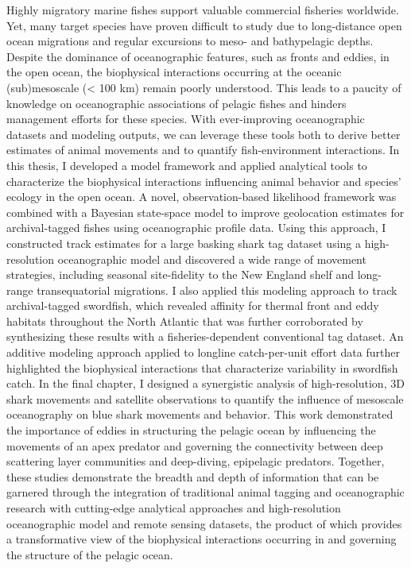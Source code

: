 Highly migratory marine fishes support valuable commercial fisheries worldwide. Yet, many target species have proven difficult to study due to long-distance open ocean migrations and regular excursions to meso- and bathypelagic depths. Despite the dominance of oceanographic features, such as fronts and eddies, in the open ocean, the biophysical interactions occurring at the oceanic (sub)mesoscale (< 100 km) remain poorly understood. This leads to a paucity of knowledge on oceanographic associations of pelagic fishes and hinders management efforts for these species. With ever-improving oceanographic datasets and modeling outputs, we can leverage these tools both to derive better estimates of animal movements and to quantify fish-environment interactions. In this thesis, I developed a model framework and applied analytical tools to characterize the biophysical interactions influencing animal behavior and species' ecology in the open ocean. A novel, observation-based likelihood framework was combined with a Bayesian state-space model to improve geolocation estimates for archival-tagged fishes using oceanographic profile data. Using this approach, I constructed track estimates for a large basking shark tag dataset using a high-resolution oceanographic model and discovered a wide range of movement strategies, including seasonal site-fidelity to the New England shelf and long-range transequatorial migrations. I also applied this modeling approach to track archival-tagged swordfish, which revealed affinity for thermal front and eddy habitats throughout the North Atlantic that was further corroborated by synthesizing these results with a fisheries-dependent conventional tag dataset. An additive modeling approach applied to longline catch-per-unit effort data further highlighted the biophysical interactions that characterize variability in swordfish catch. In the final chapter, I designed a synergistic analysis of high-resolution, 3D shark movements and satellite observations to quantify the influence of mesoscale oceanography on blue shark movements and behavior. This work demonstrated the importance of eddies in structuring the pelagic ocean by influencing the movements of an apex predator and governing the connectivity between deep scattering layer communities and deep-diving, epipelagic predators. Together, these studies demonstrate the breadth and depth of information that can be garnered through the integration of traditional animal tagging and oceanographic research with cutting-edge analytical approaches and high-resolution oceanographic model and remote sensing datasets, the product of which provides a transformative view of the biophysical interactions occurring in and governing the structure of the pelagic ocean.